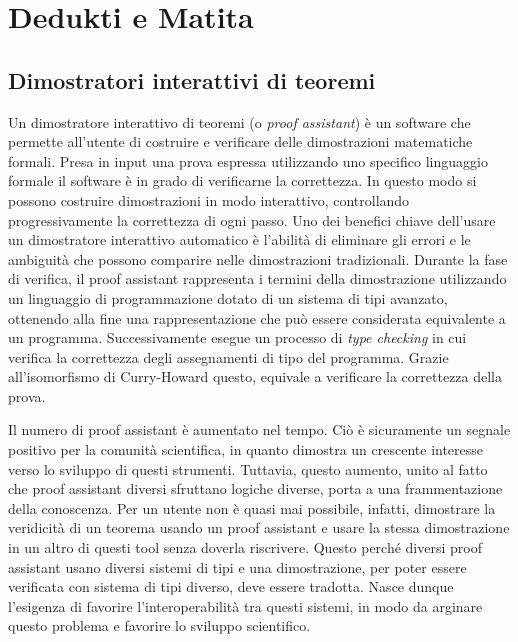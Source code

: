 \documentclass[12pt,a4paper]{mimosis}
\begin{document}
\section{Dedukti e Matita}\label{proofAssistant}
\subsection{Dimostratori interattivi di teoremi} 
Un dimostratore interattivo di teoremi (o \textit{proof assistant}) è un software 
che permette all'utente di costruire e verificare delle dimostrazioni matematiche
formali. Presa in input una prova espressa utilizzando uno specifico linguaggio 
formale il software è in grado di
verificarne la correttezza. In questo modo si possono costruire dimostrazioni
in modo interattivo, controllando progressivamente la correttezza di ogni passo.
Uno dei benefici chiave dell'usare un dimostratore interattivo automatico è l'abilità
di eliminare gli errori e le ambiguità che possono comparire nelle 
dimostrazioni tradizionali. Durante la fase di verifica, il proof assistant rappresenta 
i termini della dimostrazione utilizzando un linguaggio di programmazione dotato di
un sistema di tipi avanzato, ottenendo alla fine una rappresentazione che può essere
considerata equivalente a un programma. Successivamente esegue un processo di \textit{
  type checking} in cui verifica la correttezza degli assegnamenti di tipo del programma.
Grazie all'isomorfismo di Curry-Howard questo, equivale a verificare la correttezza della 
prova.

Il numero di proof assistant è aumentato nel tempo. Ciò è sicuramente un segnale
positivo per la comunità scientifica, in quanto dimostra un crescente interesse
verso lo sviluppo di questi strumenti. Tuttavia, questo aumento, unito al fatto
che proof assistant diversi sfruttano logiche diverse, porta a una frammentazione
della conoscenza. Per un utente non è quasi mai possibile, infatti, dimostrare la
veridicità di un teorema usando un proof assistant e usare la stessa dimostrazione
in un altro di questi tool senza doverla riscrivere.
Questo perché diversi proof assistant usano diversi sistemi di tipi e una dimostrazione,
per poter essere verificata con sistema di tipi diverso, deve essere tradotta.
Nasce dunque l'esigenza di favorire l'interoperabilità tra questi sistemi, in
modo da arginare questo problema e favorire lo sviluppo scientifico. 
\end{document}
